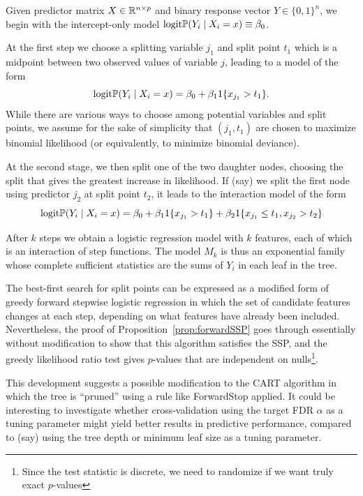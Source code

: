 \documentclass{article}
\begin{document}
Given predictor matrix $X \in \mathbb{R}^{n\times p}$ and binary response vector $Y\in \{0,1\}^n$, we begin with the intercept-only model $\textrm{logit} \mathbb{P}(Y_i \mid X_i = x) \equiv \beta_0$.

At the first step we choose a splitting variable $j_1$ and split point $t_1$ which is a midpoint between two observed values of variable $j$, leading to a model of the form
\begin{equation}
\textrm{logit} \mathbb{P}(Y_i \mid X_i=x) = \beta_0 + \beta_{1} 1\{x_{j_1} > t_1\}.
\end{equation}
While there are various ways to choose among potential variables and split points, we assume for the sake of simplicity that $(j_1,t_1)$ are chosen to maximize binomial likelihood (or equivalently, to minimize binomial deviance).

At the second stage, we then split one of the two daughter nodes, choosing the split that gives the greatest increase in likelihood. If (say) we split the first node using predictor $j_2$ at split point $t_2$, it leads to the interaction model of the form
\begin{equation}
\textrm{logit} \mathbb{P}(Y_i \mid X_i=x) = \beta_0 + \beta_{1} 1\{x_{j_1} > t_1\} + \beta_2 1\{x_{j_1} \leq t_1, x_{j_2} > t_2\}
\label{eqn:intmodel}
\end{equation}

After $k$ steps we obtain a logistic regression model with $k$ features, each of which is an interaction of step functions. The model $M_k$ is thus an exponential family whose complete sufficient statistics are the sums of $Y_i$ in each leaf in the tree.

The best-first search for split points can be expressed as a modified form of greedy forward stepwise logistic regression in which the set of candidate features changes at each step, depending on what features have already been included. Nevertheless, the proof of Proposition~\ref{prop:forwardSSP} goes through essentially without modification to show that this algorithm satisfies the SSP, and the greedy likelihood ratio test gives $p$-values that are independent on nulls\footnote{Since the test statistic is discrete, we need to randomize if we want truly exact $p$-values}.

This development suggests a possible modification to the CART algorithm in which the tree is ``pruned'' using a rule like ForwardStop applied. It could be interesting to investigate whether cross-validation using the target FDR $\alpha$ as a tuning parameter might yield better results in predictive performance, compared to (say) using the tree depth or minimum leaf size as a tuning parameter.
\end{document}
